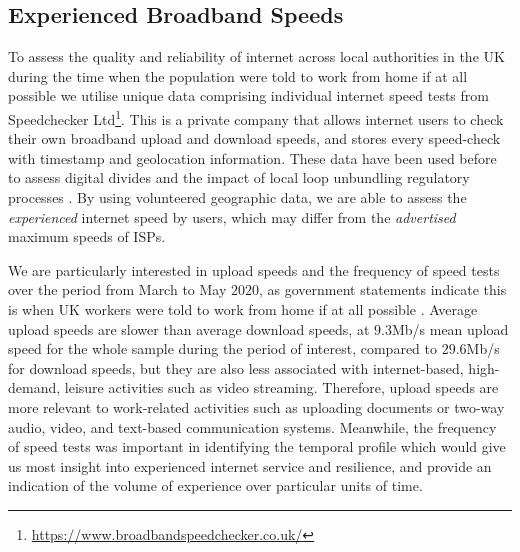 \documentclass[,]{sagej}
\begin{document}
\hypertarget{sec:3.2}{%
\subsection{Experienced Broadband Speeds}\label{sec:3.2}}

To assess the quality and reliability of internet across local
authorities in the UK during the time when the population were told to
work from home if at all possible we utilise unique data comprising
individual internet speed tests from Speedchecker Ltd\footnote{\url{https://www.broadbandspeedchecker.co.uk/}}.
This is a private company that allows internet users to check their own
broadband upload and download speeds, and stores every speed-check with
timestamp and geolocation information. These data have been used before
to assess digital divides \citep{riddlesden2014broadband} and the impact
of local loop unbundling regulatory processes
\citep{nardotto2015unbundling}. By using volunteered geographic data, we
are able to assess the \emph{experienced} internet speed by users, which
may differ from the \emph{advertised} maximum speeds of ISPs.

We are particularly interested in upload speeds and the frequency of
speed tests over the period from March to May \(2020\), as government
statements indicate this is when UK workers were told to work from home
if at all possible \citep{GovUK2020}. Average upload speeds are slower
than average download speeds, at \(9.3\)Mb/s mean upload speed for the
whole sample during the period of interest, compared to \(29.6\)Mb/s for
download speeds, but they are also less associated with internet-based,
high-demand, leisure activities such as video streaming. Therefore,
upload speeds are more relevant to work-related activities such as
uploading documents or two-way audio, video, and text-based
communication systems. Meanwhile, the frequency of speed tests was
important in identifying the temporal profile which would give us most
insight into experienced internet service and resilience, and provide an
indication of the volume of experience over particular units of time.
\end{document}
